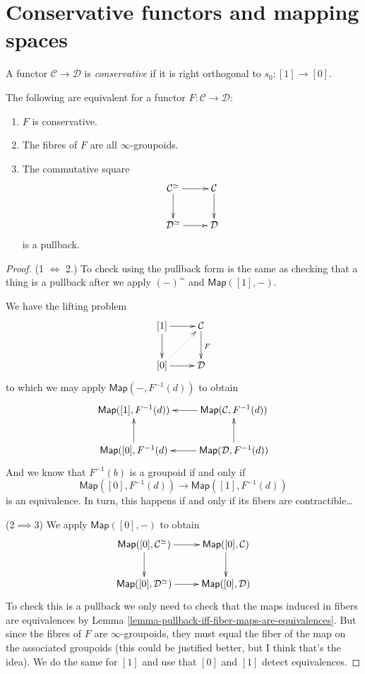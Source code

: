 \section{Conservative functors and mapping spaces}
\label{section-conservative-functors-and-mapping-spaces}

\begin{definition}
\label{definition-conservative-functor}
A functor $\mathcal{C} \to \mathcal{D}$ is {\it conservative} 
if it is right orthogonal to $s_0:[1]\to [0]$.
\end{definition}

\begin{exercise}
\label{exercise-equivalences-for-conservative-functor}
The following are equivalent for a functor $F:\mathcal{C} \to \mathcal{D}$:
\begin{enumerate}
\item $F$ is conservative.
\item The fibres of $F$ are all $\infty$-groupoids.
\item The commutative square
$$
\xymatrix{
\mathcal{C}^{\simeq}\ar[r]\ar[d]&\mathcal{C}\ar[d]\\
\mathcal{D}^{\simeq}\ar[r]&\mathcal{D}
}
$$
is a pullback.
\end{enumerate}
\end{exercise}

\begin{proof}
(1 $\iff$ 2.) To check using the pullback form
is the same as checking that a thing
is a pullback after we apply $(-)^\simeq$ 
and $\mathsf{Map}([1],-)$.

We have the lifting problem
$$
\xymatrix{
[1]\ar[r]\ar[d]&\mathcal{C}\ar[d]^{F}\\
[0]\ar[r]\ar@{.>}[ur]&\mathcal{D}
}
$$
to which we may apply $\mathsf{Map}(-,F^{-1}(d))$ to obtain
$$
\xymatrix{
\mathsf{Map}([1],F^{-1}(d))&\mathsf{Map}(\mathcal{C},F^{-1}(d))\ar[l]\\
\mathsf{Map}([0],F^{-1}(d)\ar[u]&\mathsf{Map}(\mathcal{D},F^{-1}(d))
\ar[l]\ar[u]
}
$$
And we know that $F^{-1}(b)$ 
is a groupoid if and only if
$$
\mathsf{Map}([0],F^{-1}(d))\to \mathsf{Map}([1],F^{-1}(d))
$$
is an equivalence. In turn, this happens if and only if
its fibers are contractible…

($2 \implies 3$) We apply $\mathsf{Map}([0],-)$ to obtain
$$
\xymatrix{
\mathsf{Map}([0],\mathcal{C}^\simeq)\ar[r]\ar[d]
&\mathsf{Map}([0],\mathcal{C})\ar[d]\\
\mathsf{Map}([0],\mathcal{D}^{\simeq})\ar[r]&\mathsf{Map}([0],\mathcal{D})
}
$$
To check this is a pullback we only need to
check that the maps induced in fibers are equivalences
by  Lemma \ref{lemma-pullback-iff-fiber-maps-are-equivalences}.
But since the fibres of $F$ are $\infty$-groupoids,
they must equal the fiber of the map on the associated groupoids
(this could be justified better, but I think that's the idea).
We do the same for $[1]$ and use that $[0]$ and $[1]$ detect
equivalences.
\end{proof}

